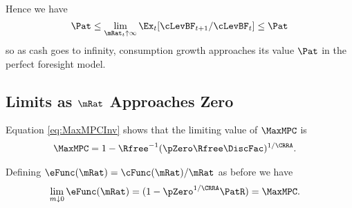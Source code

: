\documentclass[BufferStockTheory]{subfiles}
\begin{document}
Hence we have
\begin{equation*}
  {\Pat}  \leq \lim_{\mRat_{t} \uparrow \infty} \Ex_{t}[\cLevBF_{t+1}/\cLevBF_{t}] \leq {\Pat} 
\end{equation*}
so as cash goes to infinity, consumption growth approaches its
value $\Pat$ in the perfect foresight model.

\begin{comment}
  Of course, the constraint never becomes irrelevant if human wealth is
  infinite.  We ruled out infinite human wealth at the beginning of this
  section by assuming $\Rfree> \PGro$.  If this finite human wealth
  condition does not hold, it is possible to show that for any finite
  horizon consumer the marginal propensity to consume approaches the
  finite-horizon perfect foresight MPC as wealth approaches infinity.
  However, as the horizon gets longer, the perfect foresight MPC
  approaches zero.  It can be shown therefore that the limiting MPC for
  the converged consumption function approaches (but never reaches)
  zero.  (This is why we chose $\MinMinMPC=0$ if the \FHWC~fails
  in the proofs above.)
\end{comment}

\hypertarget{LimitsAsmtToZero}{}
\subsection{Limits as $\mRat$ Approaches Zero}
\label{subsec:LimitsAsmtToZero}

Equation \eqref{eq:MaxMPCInv} shows that the limiting value of
$\MaxMPC$ is
\begin{align*}
  \MaxMPC  & = 1-{\Rfree}^{-1}(\pZero  \Rfree\DiscFac)^{1/\CRRA}. 
\end{align*}

Defining $\eFunc(\mRat)=\cFunc(\mRat)/\mRat$ as before we have
\begin{align*}
  \lim_{m \downarrow 0} \eFunc(\mRat)  & = (1-\pZero^{1/\CRRA}\PatR) = \MaxMPC .
\end{align*}
\end{document}
